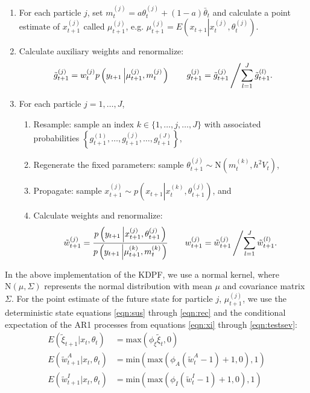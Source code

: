\documentclass{article}
\begin{document}
\begin{enumerate}
\item For each particle $j$, set $m_t^{(j)} = a\theta_t^{(j)} + (1-a)\bar{\theta}_t$ and calculate a point estimate of $x_{t+1}^{(j)}$ called $\mu_{t+1}^{(j)}$, e.g. $\mu_{t+1}^{(j)} = E\left(x_{t+1}\left|x_t^{(j)},\theta_t^{(j)} \right.\right)$.
\item Calculate auxiliary weights and renormalize:
\[ \tilde{g}_{t+1}^{(j)} = w_t^{(j)} p\left(y_{t+1}\left|\mu_{t+1}^{(j)},m_t^{(j)}\right.\right) \qquad g_{t+1}^{(j)} = \tilde{g}_{t+1}^{(j)}\left/ \sum_{l=1}^J \tilde{g}_{t+1}^{(l)}. \right. \]
\item For each particle $j=1,\ldots,J$,
	\begin{enumerate}
    \item Resample: sample an index $k\in\{1,\ldots,j,\ldots,J\}$ with associated probabilities $\left\{g_{t+1}^{(1)},\ldots,g_{t+1}^{(j)},\ldots,g_{t+1}^{(J)}\right\}$,
	\item Regenerate the fixed parameters: sample $\theta_{t+1}^{(j)} \sim \mbox{N}\left(m_t^{(k)}, h^2V_t \right)$,
	\item Propagate: sample $x_{t+1}^{(j)} \sim p\left(x_{t+1}\left|x_t^{(k)},\theta_{t+1}^{(j)}\right.\right)$, and
	\item Calculate weights and renormalize:
	\[ \tilde{w}_{t+1}^{(j)} = \frac{p\left(y_{t+1}\left|x_{t+1}^{(j)},\theta_{t+1}^{(j)}\right.\right)}{p\left(y_{t+1}\left|\mu_{t+1}^{(k)},m_t^{(k)}\right.\right)}
	\qquad
	w_{t+1}^{(j)} = \tilde{w}_{t+1}^{(j)}\left/\sum_{l=1}^J \tilde{w}_{t+1}^{(l)}. \right. \]
	\end{enumerate}
\end{enumerate}

\noindent In the above implementation of the KDPF, we use a normal kernel, where $\mbox{N}(\mu,\Sigma)$ represents the normal distribution with mean $\mu$ and covariance matrix $\Sigma$. For the point estimate of the future state for particle $j$, $\mu_{t+1}^{(j)}$, we use the deterministic state equations \ref{eqn:sus} through \ref{eqn:rec} and the conditional expectation of the AR1 processes from equations \ref{eqn:xi} through \ref{eqn:testsev}:
\begin{align*}
E\left(\tilde{\xi}_{t+1}\left|x_t,\theta_t \right.\right) &= \mbox{max}(\phi_\xi \tilde{\xi}_t, 0) \\
E\left(\tilde{w}^A_{t+1}\left|x_t,\theta_t \right.\right) &= \mbox{min}\left(\mbox{max}(\phi_A (\tilde{w}^A_t - 1) + 1, 0), 1\right) \\
E\left(\tilde{w}^I_{t+1}\left|x_t,\theta_t \right.\right) &= \mbox{min}\left(\mbox{max}(\phi_I (\tilde{w}^I_t - 1) + 1, 0), 1\right)
\end{align*}
\end{document}
